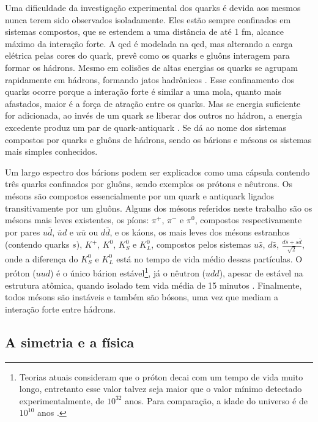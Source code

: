 Uma dificuldade da investigação experimental dos quarks é devida aos mesmos
nunca terem sido observados isoladamente. Eles estão sempre confinados em sistemas
compostos, que se estendem a uma distância de até 1 fm, alcance máximo da interação forte. 
A \gls{qcd} é modelada na \gls{qed}, mas alterando a carga elétrica pelas cores do quark, 
prevê como os quarks e gluôns interagem para formar os hádrons. Mesmo
em colisões de altas energias os quarks se agrupam rapidamente em hádrons,
formando jatos hadrônicos \cite{Intro_Nuclear}. Esse confinamento dos quarks ocorre 
porque a interação forte é similar a uma mola, quanto mais afastados, maior é a
força de atração entre os quarks. Mas se energia suficiente for adicionada,
ao invés de um quark se liberar dos outros no hádron, a energia excedente produz
um par de quark-antiquark \cite{Beiser}.
Se dá ao nome dos sistemas compostos por quarks e gluôns de
hádrons, sendo os bárions e mésons os sistemas mais simples conhecidos. 

Um largo espectro dos bárions podem ser explicados como uma cápsula contendo
três quarks confinados por gluôns, sendo exemplos os prótons e nêutrons. Os mésons
são compostos essencialmente por um quark e antiquark ligados
transitivamente por um gluôns. Alguns dos mésons referidos neste trabalho são
os mésons mais leves existentes, os píons: $\pi^{+}$,
$\pi^{-}$ e $\pi^{0}$, compostos respectivamente por pares $u\bar{d}$, $\bar{u}d$ e
$u\bar{u}$ ou $d\bar{d}$, e os káons, os mais leves dos mésons estranhos
(contendo quarks $s$), $K^{+}$, $K^{0}$, $K^{0}_{S}$ e $K^{0}_{L}$, 
compostos pelos sistemas $u\bar{s}$, $d\bar{s}$,
$\frac{d\bar{s}+s\bar{d}}{\sqrt{2}}$, onde a diferença do $K^{0}_{S}$ e
$K^{0}_{L}$ está no tempo de vida médio dessas partículas. 
O próton ($uud$) é o único bárion estável\footnote{Teorias atuais consideram que
o próton decai com um tempo de vida muito longo, entretanto esse valor talvez seja maior 
que o valor mínimo detectado experimentalmente, de $10^{32}$ anos. 
Para comparação, a idade do universo é de $10^{10}$ anos \cite{Beiser}.}, 
já o nêutron ($udd$), apesar de estável na estrutura atômica,
quando isolado tem vida média de 15 minutos \cite{Intro_Standard}. Finalmente, 
todos mésons são instáveis e também são bósons, uma vez que mediam a interação
forte entre hádrons.

\subsection{A simetria e a física}
\label{ssec:simetria}

